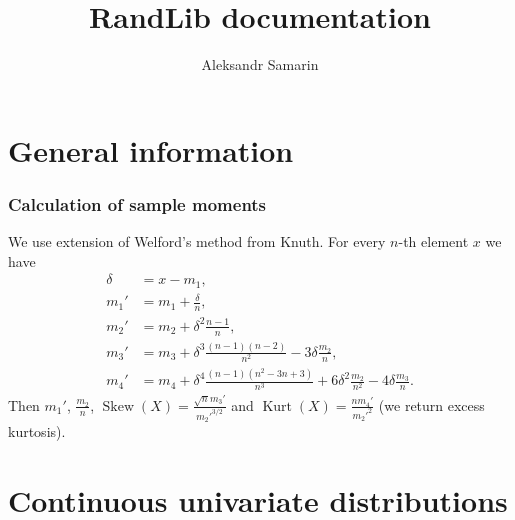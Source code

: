 \documentclass[a4paper,11pt]{article}
\title{RandLib documentation}
\author{Aleksandr Samarin}
\theoremstyle{plain}
\theoremstyle{definition}
\begin{document}
	
	\maketitle
	\tableofcontents
	
	\pagebreak
	\part{General information}
	\section{Calculation of sample moments}
	We use extension of Welford's method from Knuth. For every $n$-th element $x$ we have
	\[
	\begin{aligned}
	\delta &= x - m_1, \\
	m_1' &= m_1 +  \frac{\delta}{n}, \\
	m_2' &= m_2 +  \delta^2 \frac{n-1}{n}, \\
	m_3' &= m_3 + \delta^3 \frac{(n-1)(n-2)}{n^2} - 3\delta \frac{m_2}{n}, \\
	m_4' &= m_4 +  \delta^4 \frac{(n-1)(n^2-3n+3)}{n^3}+6\delta^2 \frac{m_2}{n^2}-4\delta\frac{m_3}{n}.
	\end{aligned}
	\]
	Then $ m_1'$, $\frac{m_2}{n}$, $\operatorname{Skew}(X) = \frac{\sqrt{n}m_3'}{m_2'^{3/2}}$ and $\operatorname{Kurt}(X) = \frac{nm_4'}{m_2'^2}$ (we return excess kurtosis). 
	
	\pagebreak
	\part{Continuous univariate distributions}
\end{document}

